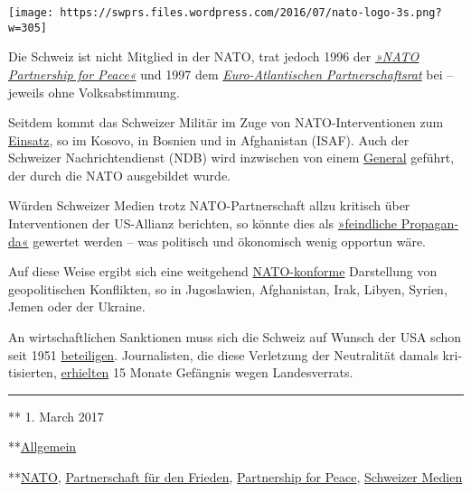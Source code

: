 \texttt{[image: https://swprs.files.wordpress.com/2016/07/nato-logo-3s.png?w=305]}

Die Schweiz ist nicht Mit­glied in der NATO, trat jedoch 1996 der
\emph{\href{http://www.pfp.admin.ch/}{»NATO Partner­ship for Peace«}}
und 1997 dem
\emph{\href{http://www.nato.int/docu/review/2007/issue2/german/art5.html}{Euro-Atlan­tischen
Par­tner­schafts­rat}} bei -- je­weils ohne Volks­ab­stimmung.

Seit­dem kommt das Schweizer Militär im Zuge von NATO-Inter­­ven­­tionen
zum \href{https://www.peace-support.ch/de/}{Einsatz}, so im Kosovo, in
Bosnien und in Afgha­ni­stan (ISAF). Auch der Schweizer
Nach­richten­dienst (NDB) wird inzwischen von einem
\href{https://www.admin.ch/gov/de/start/dokumentation/medienmitteilungen.msg-id-70400.html}{General}
geführt, der durch die NATO ausgebildet wurde.

Würden Schweizer Medien trotz NATO-Part­ner­schaft allzu kritisch über
Interventionen der US-Allianz berichten, so könnte dies als
\href{https://swprs.org/russische-propaganda/}{»feind­li­che
Pro­pa­gan­da«} ge­wer­tet werden -- was po­li­tisch und ökonomisch
wenig opportun wäre.

Auf diese Weise ergibt sich eine weitgehend
\href{https://swprs.org/medien-navigator/}{NATO-kon­forme} Darstellung
von geopolitischen Kon­flik­ten, so in Jugoslawien, Afgha­ni­stan, Irak,
Li­by­en, Syrien, Jemen oder der Ukraine.

An wirtschaftlichen Sanktionen muss sich die Schweiz auf Wunsch der USA
schon seit 1951
\href{https://de.wikipedia.org/wiki/Hotz-Linder-Agreement}{be­tei­li­gen}.
Jour­na­listen, die diese Ver­letzung der Neu­tra­lität damals
kri­ti­sierten,
\href{https://web.archive.org/web/20141206061445/http://buchundnetz.com/online-buch/schnueffelstaat-schweiz-ob/iii-modernisieren-oder-abschaffen/staatsschutz-je-nach-wetterlage/}{er­hielten}
15 Mo­nate Gefäng­nis wegen Landes­verrats.

\begin{center}\rule{0.5\linewidth}{\linethickness}\end{center}

** 1. March 2017

**\href{https://swprs.org/category/allgemein/}{Allgemein}

**\href{https://swprs.org/tag/nato/}{NATO},
\href{https://swprs.org/tag/partnerschaft-fuer-den-frieden/}{Partnerschaft
für den Frieden},
\href{https://swprs.org/tag/partnership-for-peace/}{Partnership for
Peace}, \href{https://swprs.org/tag/schweizer-medien/}{Schweizer Medien}

